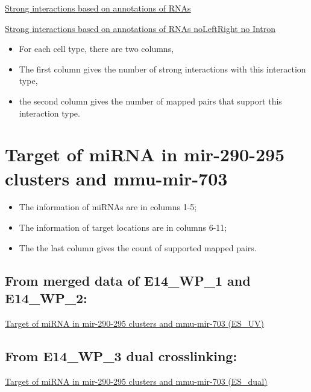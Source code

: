 \documentclass[letterpaper,10pt,english]{sphinxmanual}
\begin{document}
\href{http://systemsbio.ucsd.edu/RNA-Hi-C/Data/Count\_types\_interaction\_fragment\_wholeRNA.htm}{Strong interactions based on annotations of RNAs}

\href{http://systemsbio.ucsd.edu/RNA-Hi-C/Data/Count\_types\_interaction\_fragment\_wholeRNA\_noLeftRight.htm}{Strong interactions based on annotations of RNAs noLeftRight no Intron}
\begin{itemize}
\item {} 
For each cell type, there are two columns,

\item {} 
The first column gives the number of strong interactions with this interaction type,

\item {} 
the second column gives the number of mapped pairs that support this interaction type.

\end{itemize}


\section{Target of miRNA in mir-290-295 clusters and mmu-mir-703}
\label{Data_Resources:target-of-mirna-in-mir-290-295-clusters-and-mmu-mir-703}\begin{itemize}
\item {} 
The information of miRNAs are in columns 1-5;

\item {} 
The information of target locations are in columns 6-11;

\item {} 
The the last column gives the count of supported mapped pairs.

\end{itemize}


\subsection{From merged data of E14\_WP\_1 and E14\_WP\_2:}
\label{Data_Resources:id5}
\href{http://systemsbio.ucsd.edu/RNA-Hi-C/Data/ACCT\_GGCG\_interaction\_clusters\_miRNA.xlsx}{Target of miRNA in mir-290-295 clusters and mmu-mir-703 (ES\_UV)}


\subsection{From E14\_WP\_3 dual crosslinking:}
\label{Data_Resources:id6}
\href{http://systemsbio.ucsd.edu/RNA-Hi-C/Data/AATG\_interaction\_clusters\_miRNA.xlsx}{Target of miRNA in mir-290-295 clusters and mmu-mir-703 (ES\_dual)}
\end{document}
